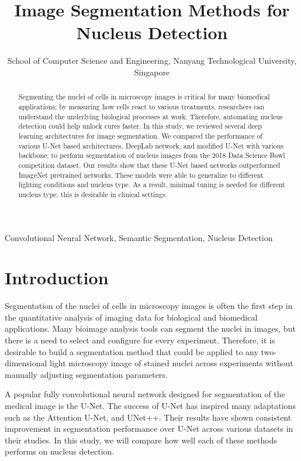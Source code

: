 \documentclass[conference]{IEEEtran}
\begin{document}
\title{Image Segmentation Methods for Nucleus Detection}

\author{
School of Computer Science and Engineering, Nanyang Technological University, Singapore
}

\maketitle

\begin{abstract}
Segmenting the nuclei of cells in microscopy images is critical for many biomedical applications; by measuring how cells react to various treatments, researchers can understand the underlying biological processes at work. Therefore, automating nucleus detection could help unlock cures faster. In this study, we reviewed several deep learning architectures for image segmentation. We compared the performance of various U-Net based architectures, DeepLab network, and modified U-Net with various backbone; to perform segmentation of nucleus images from the 2018 Data Science Bowl competition dataset. Our results show that these U-Net based networks outperformed ImageNet pretrained networks. These models were able to generalize to different lighting conditions and nucleus type. As a result, minimal tuning is needed for different nucleus type; this is desirable in clinical settings.
\end{abstract}

\begin{IEEEkeywords}
Convolutional Neural Network, Semantic Segmentation, Nucleus Detection
\end{IEEEkeywords}

\section{Introduction}

Segmentation of the nuclei of cells in microscopy images is often the first step in the quantitative analysis of imaging data for biological and biomedical applications. Many bioimage analysis tools can segment the nuclei in images, but there is a need to select and configure for every experiment. Therefore, it is desirable to build a segmentation method that could be applied to any two-dimensional light microscopy image of stained nuclei across experiments without manually adjusting segmentation parameters.

A popular fully convolutional neural network designed for segmentation of the medical image is the U-Net\cite{ronneberger2015u}. The success of U-Net has inspired many adaptations such as the Attention U-Net\cite{oktay2018attention}, and UNet++\cite{zhou2018unet++}. Their results have shown consistent improvement in segmentation performance over U-Net across various datasets in their studies. In this study, we will compare how well each of these methods performs on nucleus detection.
\end{document}
